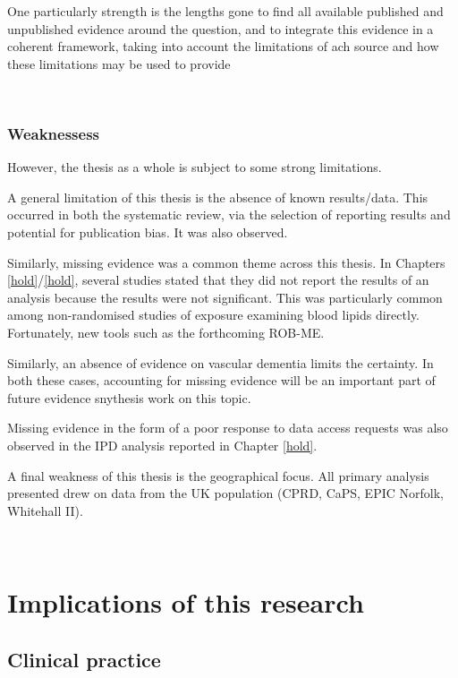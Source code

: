 \documentclass[a4paper, twoside]{templates/ociamthesis}
\begin{document}
One particularly strength is the lengths gone to find all available published and unpublished evidence around the question, and to integrate this evidence in a coherent framework, taking into account the limitations of ach source and how these limitations may be used to provide

~

\hypertarget{weaknessess}{%
\subsubsection{Weaknessess}\label{weaknessess}}

However, the thesis as a whole is subject to some strong limitations.

A general limitation of this thesis is the absence of known results/data. This occurred in both the systematic review, via the selection of reporting results and potential for publication bias. It was also observed.

Similarly, missing evidence was a common theme across this thesis. In Chapters \ref{hold}/\ref{hold}, several studies stated that they did not report the results of an analysis because the results were not significant. This was particularly common among non-randomised studies of exposure examining blood lipids directly. Fortunately, new tools such as the forthcoming ROB-ME.

Similarly, an absence of evidence on vascular dementia limits the certainty. In both these cases, accounting for missing evidence will be an important part of future evidence snythesis work on this topic.

Missing evidence in the form of a poor response to data access requests was also observed in the IPD analysis reported in Chapter \ref{hold}.

A final weakness of this thesis is the geographical focus. All primary analysis presented drew on data from the UK population (CPRD, CaPS, EPIC Norfolk, Whitehall II).

~

\hypertarget{implications-of-this-research}{%
\section{Implications of this research}\label{implications-of-this-research}}

\hypertarget{clinical-practice}{%
\subsection{Clinical practice}\label{clinical-practice}}
\end{document}
